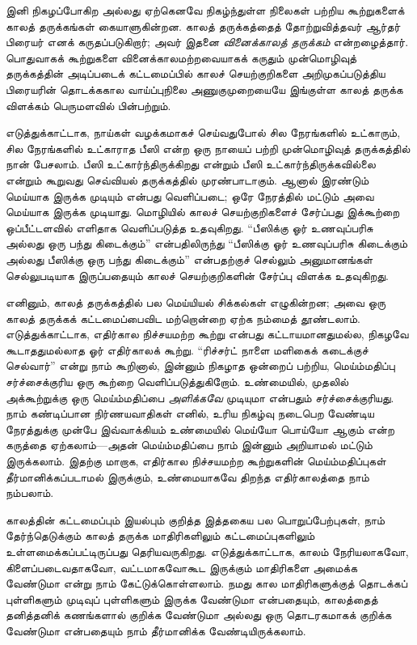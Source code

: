 \documentclass[../../../include/open-logic-section]{subfiles}
\begin{document}


இனி நிகழப்போகிற அல்லது ஏற்கெனவே நிகழ்ந்துள்ள நிலைகள் பற்றிய கூற்றுகளைக்
காலத் தருக்கங்கள் கையாளுகின்றன. காலத் தருக்கத்தைத் தோற்றுவித்தவர் ஆர்தர்
பிரையர் எனக் கருதப்படுகிறார்; அவர் இதனை \emph{வினைக்காலத் தருக்கம்}
என்றழைத்தார். பொதுவாகக் கூற்றுகளை வினைக்காலமற்றவையாகக் கருதும்
முன்மொழிவுத் தருக்கத்தின் அடிப்படைக் கட்டமைப்பில் காலச் செயற்குறிகளை
அறிமுகப்படுத்திய பிரையரின் தொடக்ககால வாய்ப்புநிலை அணுகுமுறையையே இங்குள்ள
காலத் தருக்க விளக்கம் பெருமளவில் பின்பற்றும்.

எடுத்துக்காட்டாக, நாய்கள் வழக்கமாகச் செய்வதுபோல் சில நேரங்களில் உட்காரும்,
சில நேரங்களில் உட்காராத பீஸி என்ற ஒரு நாயைப் பற்றி முன்மொழிவுத் தருக்கத்தில்
நான் பேசலாம். பீஸி உட்கார்ந்திருக்கிறது என்றும் பீஸி உட்கார்ந்திருக்கவில்லை
என்றும் கூறுவது செவ்வியல் தருக்கத்தில் முரண்பாடாகும். ஆனால் இரண்டும் மெய்யாக
இருக்க முடியும் என்பது வெளிப்படை; ஒரே நேரத்தில் மட்டும் அவை மெய்யாக இருக்க
முடியாது. மொழியில் காலச் செயற்குறிகளைச் சேர்ப்பது இக்கூற்றை ஒப்பீட்டளவில்
எளிதாக வெளிப்படுத்த உதவுகிறது. ``பீஸிக்கு ஓர் உணவுப்பரிசு அல்லது ஒரு பந்து
கிடைக்கும்'' என்பதிலிருந்து ``பீஸிக்கு ஓர் உணவுப்பரிசு கிடைக்கும் அல்லது
பீஸிக்கு ஒரு பந்து கிடைக்கும்'' என்பதற்குச் செல்லும் அனுமானங்கள்
செல்லுபடியாக இருப்பதையும் காலச் செயற்குறிகளின் சேர்ப்பு விளக்க உதவுகிறது.

எனினும், காலத் தருக்கத்தில் பல மெய்யியல் சிக்கல்கள் எழுகின்றன; அவை ஒரு
காலத் தருக்கக் கட்டமைப்பைவிட மற்றொன்றை ஏற்க நம்மைத் தூண்டலாம்.
எடுத்துக்காட்டாக, எதிர்கால நிச்சயமற்ற கூற்று என்பது கட்டாயமானதுமல்ல,
நிகழவே கூடாததுமல்லாத ஓர் எதிர்காலக் கூற்று. ``ரிச்சர்ட் நாளை மளிகைக்
கடைக்குச் செல்வார்'' என்று நாம் கூறினால், இன்னும் நிகழாத ஒன்றைப் பற்றிய,
மெய்ம்மதிப்பு சர்ச்சைக்குரிய ஒரு கூற்றை வெளிப்படுத்துகிறோம். உண்மையில்,
முதலில் அக்கூற்றுக்கு ஒரு மெய்ம்மதிப்பை \emph{அளிக்கவே} முடியுமா என்பதும்
சர்ச்சைக்குரியது. நாம் கண்டிப்பான நிர்ணயவாதிகள் எனில், உரிய நிகழ்வு
நடைபெற வேண்டிய நேரத்துக்கு முன்பே இவ்வாக்கியம் உண்மையில் மெய்யோ பொய்யோ
ஆகும் என்ற கருத்தை ஏற்கலாம்---அதன் மெய்ம்மதிப்பை நாம் இன்னும் அறியாமல்
மட்டும் இருக்கலாம். இதற்கு மாறாக, எதிர்கால நிச்சயமற்ற கூற்றுகளின்
மெய்ம்மதிப்புகள் தீர்மானிக்கப்படாமல் இருக்கும், உண்மையாகவே திறந்த
எதிர்காலத்தை நாம் நம்பலாம்.

காலத்தின் கட்டமைப்பும் இயல்பும் குறித்த இத்தகைய பல பொறுப்பேற்புகள், நாம்
தேர்ந்தெடுக்கும் காலத் தருக்க மாதிரிகளிலும் கட்டமைப்புகளிலும்
உள்ளமைக்கப்பட்டிருப்பது தெரியவருகிறது. எடுத்துக்காட்டாக, காலம் நேரியலாகவோ,
கிளைப்படைவதாகவோ, வட்டமாகவோகூட இருக்கும் மாதிரிகளை அமைக்க வேண்டுமா என்று
நாம் கேட்டுக்கொள்ளலாம். நமது கால மாதிரிகளுக்குத் தொடக்கப் புள்ளிகளும்
முடிவுப் புள்ளிகளும் இருக்க வேண்டுமா என்பதையும், காலத்தைத் தனித்தனிக்
கணங்களால் குறிக்க வேண்டுமா அல்லது ஒரு தொடரகமாகக் குறிக்க வேண்டுமா என்பதையும்
நாம் தீர்மானிக்க வேண்டியிருக்கலாம்.
\end{document}
